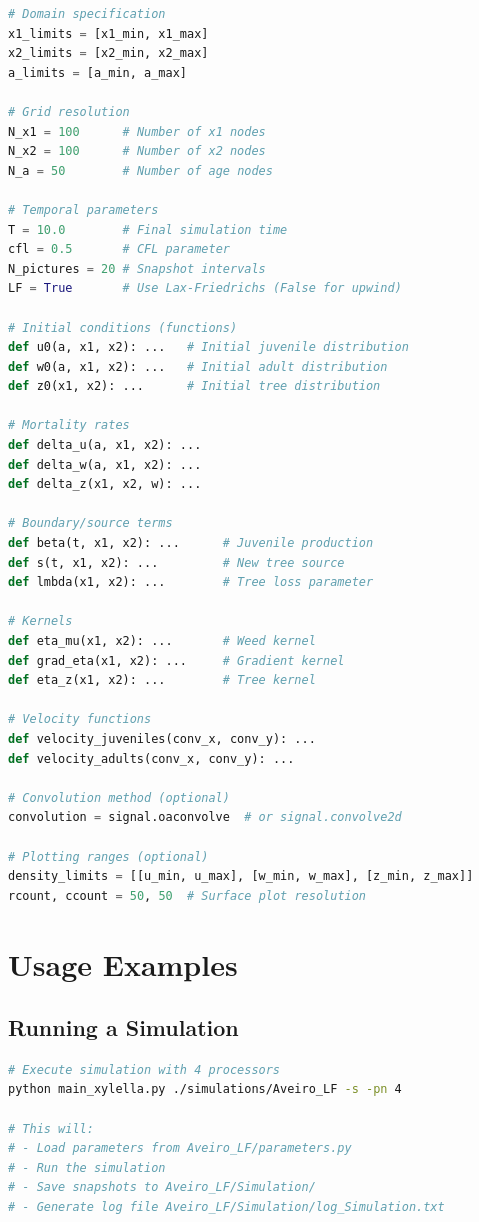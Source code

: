 \documentclass[12pt,a4paper]{report}
\begin{document}
\begin{lstlisting}[language=Python]
# Domain specification
x1_limits = [x1_min, x1_max]
x2_limits = [x2_min, x2_max]
a_limits = [a_min, a_max]

# Grid resolution
N_x1 = 100      # Number of x1 nodes
N_x2 = 100      # Number of x2 nodes
N_a = 50        # Number of age nodes

# Temporal parameters
T = 10.0        # Final simulation time
cfl = 0.5       # CFL parameter
N_pictures = 20 # Snapshot intervals
LF = True       # Use Lax-Friedrichs (False for upwind)

# Initial conditions (functions)
def u0(a, x1, x2): ...   # Initial juvenile distribution
def w0(a, x1, x2): ...   # Initial adult distribution
def z0(x1, x2): ...      # Initial tree distribution

# Mortality rates
def delta_u(a, x1, x2): ...
def delta_w(a, x1, x2): ...
def delta_z(x1, x2, w): ...

# Boundary/source terms
def beta(t, x1, x2): ...      # Juvenile production
def s(t, x1, x2): ...         # New tree source
def lmbda(x1, x2): ...        # Tree loss parameter

# Kernels
def eta_mu(x1, x2): ...       # Weed kernel
def grad_eta(x1, x2): ...     # Gradient kernel
def eta_z(x1, x2): ...        # Tree kernel

# Velocity functions
def velocity_juveniles(conv_x, conv_y): ...
def velocity_adults(conv_x, conv_y): ...

# Convolution method (optional)
convolution = signal.oaconvolve  # or signal.convolve2d

# Plotting ranges (optional)
density_limits = [[u_min, u_max], [w_min, w_max], [z_min, z_max]]
rcount, ccount = 50, 50  # Surface plot resolution
\end{lstlisting}

\chapter{Usage Examples}

\section{Running a Simulation}

\begin{lstlisting}[language=bash]
# Execute simulation with 4 processors
python main_xylella.py ./simulations/Aveiro_LF -s -pn 4

# This will:
# - Load parameters from Aveiro_LF/parameters.py
# - Run the simulation
# - Save snapshots to Aveiro_LF/Simulation/
# - Generate log file Aveiro_LF/Simulation/log_Simulation.txt
\end{lstlisting}
\end{document}
